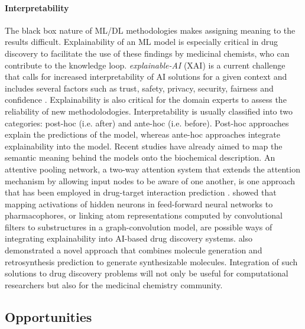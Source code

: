 \documentclass[review]{elsarticle}
\begin{document}
\paragraph{Interpretability} The black box nature of ML/DL methodologies makes assigning meaning to the results difficult. Explainability of an ML model is especially critical in drug discovery to facilitate the use of these findings by medicinal chemists, who can contribute to the knowledge loop. \textit{explainable-AI} (XAI) is a current challenge that calls for increased interpretability of  AI solutions for a given context and includes several factors such as trust, safety, privacy, security, fairness and confidence \cite{holzinger2017we}. Explainability is also critical for the domain experts to assess the reliability of new methodolodogies. Interpretability is usually classified into two categories: post-hoc (i.e. after) and ante-hoc (i.e. before). Post-hoc approaches explain the predictions of the model, whereas ante-hoc approaches integrate explainability into the model. Recent studies have already aimed to map the semantic meaning behind the models onto the biochemical description. An attentive pooling network, a two-way attention system that extends the attention mechanism by allowing input nodes to be aware of one another, is one approach that has been employed in drug-target interaction prediction \cite{gao2018interpretable}. \citet{preuer2019interpretable} showed that mapping activations of hidden neurons in feed-forward neural networks to pharmacophores, or linking atom representations computed by convolutional filters to substructures in a graph-convolution model,  are possible ways of integrating  explainability into  AI-based drug discovery systems.
\citet{bradshaw2019} also demonstrated a novel approach that combines molecule generation and retrosynthesis prediction to generate synthesizable molecules. Integration of such solutions to drug discovery problems will not only be useful for computational researchers but also for the medicinal chemistry community. 


\subsection{Opportunities}
\end{document}
